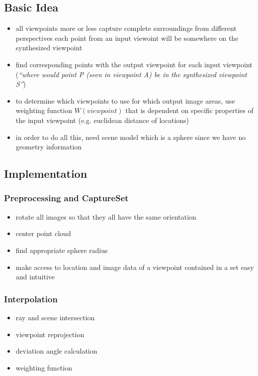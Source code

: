 \subsection{Basic Idea}
\begin{itemize}
    \item all viewpoints more or less capture complete surroundings from different perspectives \ar each point from an input viewoint will be somewhere on the synthesized viewpoint
    \item find corresponding points with the output viewpoint for each input viewpoint (\emph{``where would point P (seen in viewpoint A) be in the synthesized viewpoint S''})
    \item to determine which viewpoints to use for which output image areas, use weighting function $W(viewpoint)$ that is dependent on specific properties of the input viewpoint (e.g. euclidean distance of locations)
    \item in order to do all this, need scene model which is a sphere since we have no geometry information
\end{itemize}

\subsection{Implementation}

\subsubsection{Preprocessing and CaptureSet}
\begin{itemize}
  \item rotate all images so that they all have the same orientation
  \item center point cloud
  \item find appropriate sphere radius
  \item make access to location and image data of a viewpoint contained in a set easy and intuitive
\end{itemize}

\subsubsection{Interpolation}
\begin{itemize}
  \item ray and scene intersection
  \item viewpoint reprojection
  \item deviation angle calculation
  \item weighting function
\end{itemize}


